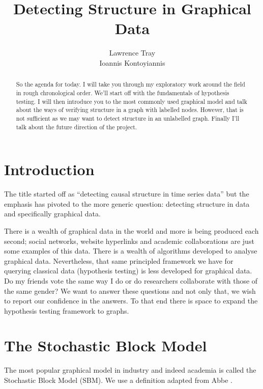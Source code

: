 \documentclass[]{article}
\title{Detecting Structure in Graphical Data}
\author{Lawrence Tray \\ Ioannis Kontoyiannis}
\begin{document}
\maketitle

\begin{abstract}
So the agenda for today. I will take you through my exploratory work around the field in rough chronological order. We’ll start off with the fundamentals of hypothesis testing. I will then introduce you to the most commonly used graphical model and talk about the ways of verifying structure in a graph with labelled nodes. However, that is not sufficient as we may want to detect structure in an unlabelled graph. Finally I’ll talk about the future direction of the project.
\end{abstract}

\tableofcontents

\section{Introduction}

The title started off as ``detecting causal structure in time series data'' but the emphasis has pivoted to the more generic question: detecting structure in data and specifically graphical data.

There is a wealth of graphical data in the world and more is being produced each second; social networks, website hyperlinks and academic collaborations are just some examples of this data. There is a wealth of algorithms developed to analyse graphical data. Nevertheless, that same principled framework we have for querying classical data (hypothesis testing) is less developed for graphical data. Do my friends vote the same way I do or do researchers collaborate with those of the same gender? We want to answer these questions and not only that, we wish to report our confidence in the answers. To that end there is space to expand the hypothesis testing framework to graphs.

\section{The Stochastic Block Model}

The most popular graphical model in industry and indeed academia is called the Stochastic Block Model (SBM). We use a definition adapted from Abbe \cite{Abbe}.
\end{document}
